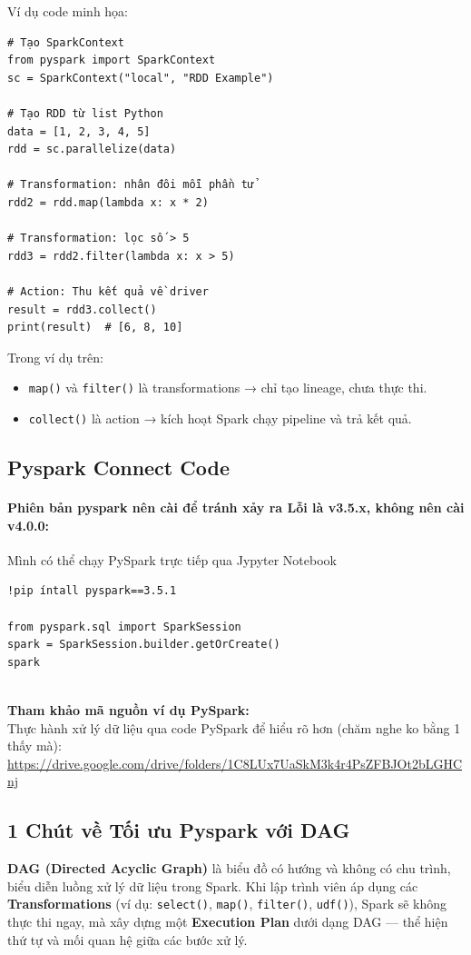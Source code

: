 \documentclass[11pt]{article}
\begin{document}
\noindent
Ví dụ code minh họa:
\begin{verbatim}
# Tạo SparkContext
from pyspark import SparkContext
sc = SparkContext("local", "RDD Example")

# Tạo RDD từ list Python
data = [1, 2, 3, 4, 5]
rdd = sc.parallelize(data)

# Transformation: nhân đôi mỗi phần tử
rdd2 = rdd.map(lambda x: x * 2)

# Transformation: lọc số > 5
rdd3 = rdd2.filter(lambda x: x > 5)

# Action: Thu kết quả về driver
result = rdd3.collect()
print(result)  # [6, 8, 10]
\end{verbatim}

\noindent
Trong ví dụ trên:
\begin{itemize}
    \item \texttt{map()} và \texttt{filter()} là transformations → chỉ tạo lineage, chưa thực thi.
    \item \texttt{collect()} là action → kích hoạt Spark chạy pipeline và trả kết quả.
\end{itemize}


\subsection{Pyspark Connect Code}
\paragraph{Phiên bản pyspark nên cài để tránh xảy ra Lỗi là v3.5.x, không nên cài v4.0.0:}
Mình có thể chạy PySpark trực tiếp qua Jypyter Notebook
\begin{verbatim}
!pip íntall pyspark==3.5.1

from pyspark.sql import SparkSession
spark = SparkSession.builder.getOrCreate()
spark
\end{verbatim} \\



\noindent \textbf{Tham khảo mã nguồn ví dụ PySpark:} \\
Thực hành xử lý dữ liệu qua code PySpark để hiểu rõ hơn (chăm nghe ko bằng 1 thấy mà): \\
\url{https://drive.google.com/drive/folders/1C8LUx7UaSkM3k4r4PsZFBJOt2bLGHCnj}

\subsection{1 Chút về Tối ưu Pyspark với DAG}
\textbf{DAG (Directed Acyclic Graph)} là biểu đồ có hướng và không có chu trình, biểu diễn luồng xử lý dữ liệu trong Spark. Khi lập trình viên áp dụng các \textbf{Transformations} (ví dụ: \texttt{select()}, \texttt{map()}, \texttt{filter()}, \texttt{udf()}), Spark sẽ không thực thi ngay, mà xây dựng một \textbf{Execution Plan} dưới dạng DAG — thể hiện thứ tự và mối quan hệ giữa các bước xử lý.
\end{document}
